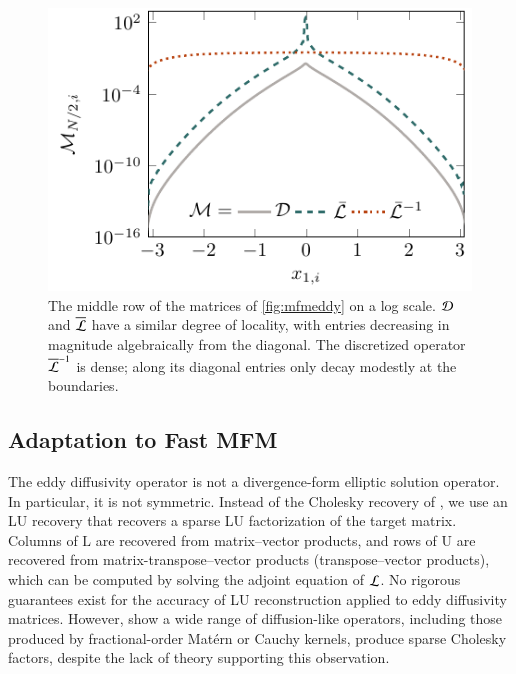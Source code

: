 \begin{figure}
    \centering
    \includegraphics{figures/slices.pdf}
    \caption{
        The middle row of the matrices of \cref{fig:mfmeddy} on a log scale.
        $\mathcal{D}$ and $\overline{\mathcal{L}}$ have a similar degree of locality, with entries decreasing in magnitude algebraically from the diagonal.
        The discretized operator $\overline{\mathcal{L}}^{-1}$ is dense; along its diagonal entries only decay modestly at the boundaries.
    } 
    \label{fig:slices}
\end{figure}


\subsection{Adaptation to Fast MFM} 

The eddy diffusivity operator is not a divergence-form elliptic solution operator. 
In particular, it is not symmetric. 
Instead of the Cholesky recovery of \citet{schaferSparseRecoveryElliptic2021}, we use an LU recovery that recovers a sparse LU factorization of the target matrix. 
Columns of $\mathrm{L}$ are recovered from matrix--vector products, and rows of $\mathrm{U}$ are recovered from matrix-transpose--vector products (transpose--vector products), which can be computed by solving the adjoint equation of $\mathcal{L}$.
No rigorous guarantees exist for the accuracy of LU reconstruction applied to eddy diffusivity matrices.
However, \citet{schafer2017compression} show a wide range of diffusion-like operators, including those produced by fractional-order Mat{\'e}rn or Cauchy kernels, produce sparse Cholesky factors, despite the lack of theory supporting this observation.

